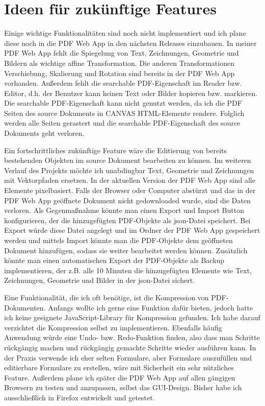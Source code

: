\section{Ideen für zukünftige Features}
Einige wichtige Funktionalitäten sind noch nicht implementiert und ich plane diese noch in die PDF Web App in den nächsten Releases einzubauen. In meiner PDF Web App fehlt die Spiegelung von Text, Zeichnungen, Geometrie und Bildern als wichtige affine Transformation. Die anderen Transformationen Verschiebung, Skalierung und Rotation sind bereits in der PDF Web App vorhanden. Außerdem fehlt die searchable PDF-Eigenschaft im Reader bzw. Editor, d.h. der Benutzer kann keinen Text oder Bilder kopieren bzw. markieren. Die searchable PDF-Eigenschaft kann nicht genutzt werden, da ich die PDF Seiten des source Dokuments in CANVAS HTML-Elemente rendere. Folglich werden alle Seiten gerastert und die searchable PDF-Eigenschaft des source Dokuments geht verloren. 
\par
Ein fortschrittliches zukünftige Feature wäre die Editierung von bereits bestehenden Objekten im source Dokument bearbeiten zu können. Im weiteren Verlauf des Projekts möchte ich unabdingbar Text, Geometrie und Zeichnungen mit Vektorpfaden ersetzen. In der aktuellen Version der PDF Web App sind alle Elemente pixelbasiert. Falls der Browser oder Computer abstürzt und das in der PDF Web App geöffnete Dokument nicht gedownloaded wurde, sind die Daten verloren. Als Gegenmaßnahme könnte man einen Export und Import Button konfigurieren, der die hinzugefügten PDF-Objekte als \gls{json}-Datei speichert. Bei Export würde diese Datei angelegt und im Ordner der PDF Web App gespeichert werden und mittels Import könnte man die PDF-Objekte dem geöffneten Dokument hinzufügen, sodass sie weiter bearbeitet werden können. Zusätzlich könnte man einen automatischen Export der PDF-Objekte als Backup implementieren, der z.B. alle 10 Minuten die hinzugefügten Elemente wie Text, Zeichnungen, Geometrie und Bilder in der \gls{json}-Datei sichert.
\par
Eine Funktionalität, die ich oft benötige, ist die Kompression von PDF-Dokumenten. Anfangs wollte ich gerne eine Funktion dafür bieten, jedoch hatte ich keine geeignete JavaScript-Library für Kompression gefunden. Ich habe darauf verzichtet die Kompression selbst zu implementieren. Ebenfalls häufig Anwendung würde eine Undo- bzw. Redo-Funktion finden, also dass man Schritte rückgängig machen und rückgängig gemachte Schritte wieder ausführen kann. In der Praxis verwende ich eher selten Formulare, aber Formulare auszufüllen und editierbare Formulare zu erstellen, wäre mit Sicherheit ein sehr nützliches Feature. Außerdem plane ich später die PDF Web App auf allen gängigen Browsern zu testen und anzupassen, selbst das GUI-Design. Bisher habe ich ausschließlich in Firefox entwickelt und getestet.